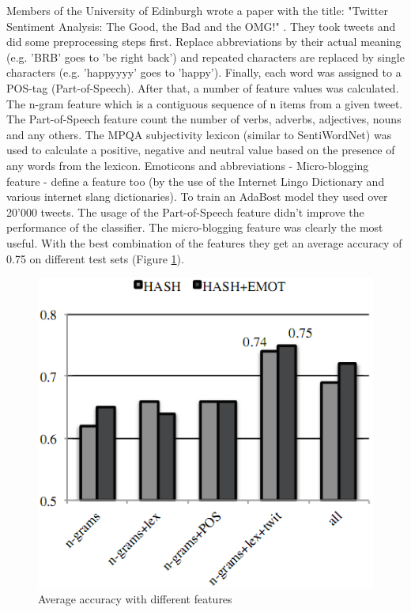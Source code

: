 \documentclass[a4paper]{article}
\begin{document}
Members of the University of Edinburgh wrote a paper with the title: "Twitter Sentiment Analysis: The Good, the Bad and the OMG!" \cite{KouloumpisWM11}. They took tweets and did some preprocessing steps first. Replace abbreviations by their actual meaning (e.g. 'BRB' goes to 'be right back') and repeated characters are replaced by single characters (e.g. 'happyyyy' goes to 'happy'). Finally, each word was assigned to a POS-tag (Part-of-Speech). After that, a number of feature values was calculated. The n-gram feature which is a contiguous sequence of n items from a given tweet. The Part-of-Speech feature count the number of verbs, adverbs, adjectives, nouns and any others. The MPQA subjectivity lexicon (similar to SentiWordNet) was used to calculate a positive, negative and neutral value based on the presence of any words from the lexicon. Emoticons and abbreviations - Micro-blogging feature - define a feature too (by the use of the Internet Lingo Dictionary and various internet slang dictionaries). To train an AdaBost model they used over 20'000 tweets. The usage of the Part-of-Speech feature didn't improve the performance of the classifier. The micro-blogging feature was clearly the most useful. With the best combination of the features they get an average accuracy of 0.75 on different test sets (Figure \ref{sentimentAccuracy}).
\begin{figure}[h!]
	\centering
	\includegraphics[scale=0.5]{images/sentimentAccuracy.png}
	\caption{Average accuracy with different features}
	\label{sentimentAccuracy}
\end{figure}
\end{document}
